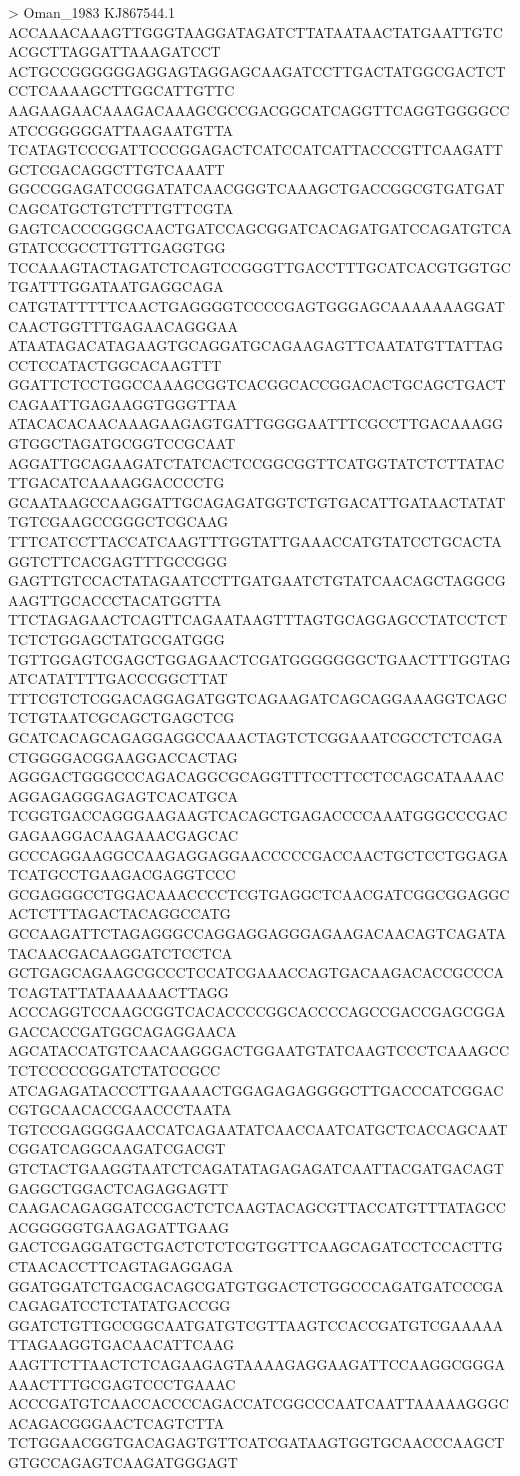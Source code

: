 > Oman_1983 KJ867544.1
ACCAAACAAAGTTGGGTAAGGATAGATCTTATAATAACTATGAATTGTCACGCTTAGGATTAAAGATCCT
ACTGCCGGGGGGAGGAGTAGGAGCAAGATCCTTGACTATGGCGACTCTCCTCAAAAGCTTGGCATTGTTC
AAGAAGAACAAAGACAAAGCGCCGACGGCATCAGGTTCAGGTGGGGCCATCCGGGGGATTAAGAATGTTA
TCATAGTCCCGATTCCCGGAGACTCATCCATCATTACCCGTTCAAGATTGCTCGACAGGCTTGTCAAATT
GGCCGGAGATCCGGATATCAACGGGTCAAAGCTGACCGGCGTGATGATCAGCATGCTGTCTTTGTTCGTA
GAGTCACCCGGGCAACTGATCCAGCGGATCACAGATGATCCAGATGTCAGTATCCGCCTTGTTGAGGTGG
TCCAAAGTACTAGATCTCAGTCCGGGTTGACCTTTGCATCACGTGGTGCTGATTTGGATAATGAGGCAGA
CATGTATTTTTCAACTGAGGGGTCCCCGAGTGGGAGCAAAAAAAGGATCAACTGGTTTGAGAACAGGGAA
ATAATAGACATAGAAGTGCAGGATGCAGAAGAGTTCAATATGTTATTAGCCTCCATACTGGCACAAGTTT
GGATTCTCCTGGCCAAAGCGGTCACGGCACCGGACACTGCAGCTGACTCAGAATTGAGAAGGTGGGTTAA
ATACACACAACAAAGAAGAGTGATTGGGGAATTTCGCCTTGACAAAGGGTGGCTAGATGCGGTCCGCAAT
AGGATTGCAGAAGATCTATCACTCCGGCGGTTCATGGTATCTCTTATACTTGACATCAAAAGGACCCCTG
GCAATAAGCCAAGGATTGCAGAGATGGTCTGTGACATTGATAACTATATTGTCGAAGCCGGGCTCGCAAG
TTTCATCCTTACCATCAAGTTTGGTATTGAAACCATGTATCCTGCACTAGGTCTTCACGAGTTTGCCGGG
GAGTTGTCCACTATAGAATCCTTGATGAATCTGTATCAACAGCTAGGCGAAGTTGCACCCTACATGGTTA
TTCTAGAGAACTCAGTTCAGAATAAGTTTAGTGCAGGAGCCTATCCTCTTCTCTGGAGCTATGCGATGGG
TGTTGGAGTCGAGCTGGAGAACTCGATGGGGGGGCTGAACTTTGGTAGATCATATTTTGACCCGGCTTAT
TTTCGTCTCGGACAGGAGATGGTCAGAAGATCAGCAGGAAAGGTCAGCTCTGTAATCGCAGCTGAGCTCG
GCATCACAGCAGAGGAGGCCAAACTAGTCTCGGAAATCGCCTCTCAGACTGGGGACGGAAGGACCACTAG
AGGGACTGGGCCCAGACAGGCGCAGGTTTCCTTCCTCCAGCATAAAACAGGAGAGGGAGAGTCACATGCA
TCGGTGACCAGGGAAGAAGTCACAGCTGAGACCCCAAATGGGCCCGACGAGAAGGACAAGAAACGAGCAC
GCCCAGGAAGGCCAAGAGGAGGAACCCCCGACCAACTGCTCCTGGAGATCATGCCTGAAGACGAGGTCCC
GCGAGGGCCTGGACAAACCCCTCGTGAGGCTCAACGATCGGCGGAGGCACTCTTTAGACTACAGGCCATG
GCCAAGATTCTAGAGGGCCAGGAGGAGGGAGAAGACAACAGTCAGATATACAACGACAAGGATCTCCTCA
GCTGAGCAGAAGCGCCCTCCATCGAAACCAGTGACAAGACACCGCCCATCAGTATTATAAAAAACTTAGG
ACCCAGGTCCAAGCGGTCACACCCCGGCACCCCAGCCGACCGAGCGGAGACCACCGATGGCAGAGGAACA
AGCATACCATGTCAACAAGGGACTGGAATGTATCAAGTCCCTCAAAGCCTCTCCCCCGGATCTATCCGCC
ATCAGAGATACCCTTGAAAACTGGAGAGAGGGGCTTGACCCATCGGACCGTGCAACACCGAACCCTAATA
TGTCCGAGGGGAACCATCAGAATATCAACCAATCATGCTCACCAGCAATCGGATCAGGCAAGATCGACGT
GTCTACTGAAGGTAATCTCAGATATAGAGAGATCAATTACGATGACAGTGAGGCTGGACTCAGAGGAGTT
CAAGACAGAGGATCCGACTCTCAAGTACAGCGTTACCATGTTTATAGCCACGGGGGTGAAGAGATTGAAG
GACTCGAGGATGCTGACTCTCTCGTGGTTCAAGCAGATCCTCCACTTGCTAACACCTTCAGTAGAGGAGA
GGATGGATCTGACGACAGCGATGTGGACTCTGGCCCAGATGATCCCGACAGAGATCCTCTATATGACCGG
GGATCTGTTGCCGGCAATGATGTCGTTAAGTCCACCGATGTCGAAAAATTAGAAGGTGACAACATTCAAG
AAGTTCTTAACTCTCAGAAGAGTAAAAGAGGAAGATTCCAAGGCGGGAAAACTTTGCGAGTCCCTGAAAC
ACCCGATGTCAACCACCCCAGACCATCGGCCCAATCAATTAAAAAGGGCACAGACGGGAACTCAGTCTTA
TCTGGAACGGTGACAGAGTGTTCATCGATAAGTGGTGCAACCCAAGCTGTGCCAGAGTCAAGATGGGAGT
